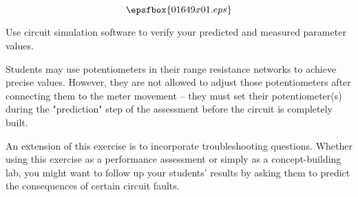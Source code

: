 

$$\epsfbox{01649x01.eps}$$

\vfil \eject






Use circuit simulation software to verify your predicted and measured parameter values.







Students may use potentiometers in their range resistance networks to achieve precise values.  However, they are not allowed to adjust those potentiometers after connecting them to the meter movement -- they must set their potentiometer(s) during the "prediction" step of the assessment before the circuit is completely built.

An extension of this exercise is to incorporate troubleshooting questions.  Whether using this exercise as a performance assessment or simply as a concept-building lab, you might want to follow up your students' results by asking them to predict the consequences of certain circuit faults.




